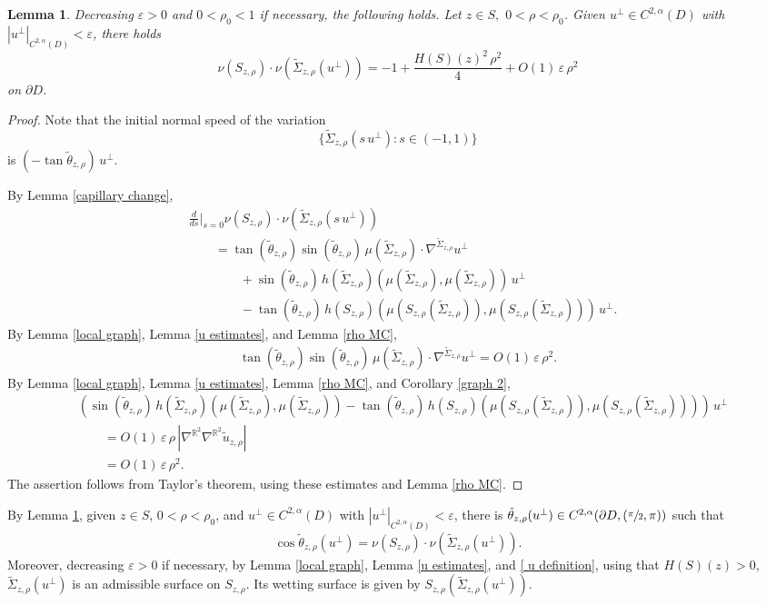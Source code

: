 \documentclass[11pt]{amsart}
\newtheorem{lem}[prop]{Lemma}
\begin{document}
\begin{lem} \label{angle} Decreasing $\varepsilon>0$ and $0<\rho_0<1$ if necessary, the following holds. Let $z\in S,$ $0<\rho<\rho_0$. Given $u^\perp\in C^{2,\alpha}(D)$ with $|u^\perp|_{C^{2,\alpha}(D)}<\varepsilon$, there holds
	$$
\nu(S_{z,\rho})\cdot \nu(\tilde \Sigma_{z,\rho}(u^\perp))=-1+\frac{H(S)(z)^2\,\rho^2}{4}+O(1)\,\varepsilon\,\rho^2
	$$
	on $\partial D$.
\end{lem}
\begin{proof}
Note that the initial normal speed of the variation $$\{\tilde \Sigma_{z,\rho}(s\,u^\perp):s\in(-1,1)\}$$  is $(-\tan\tilde \theta_{z,\rho})\,u^\perp$. 

	By Lemma \ref{capillary change},
\begin{align*} 
	&\frac{d}{ds}\bigg|_{s=0}\nu(S_{z,\rho})\cdot\nu(\tilde\Sigma_{z,\rho}(s\,u^\perp))
	\\&\qquad =\tan(\tilde \theta_{z,\rho})\sin(\tilde \theta_{z,\rho})\,\mu(\tilde \Sigma_{z,\rho})\cdot \nabla^{\tilde \Sigma_{z,\rho}}u^\perp 
	\\&\qquad\qquad +\sin(\tilde \theta_{z,\rho})\,h(\tilde \Sigma_{z,\rho})(\mu(\tilde \Sigma_{z,\rho}),\mu(\tilde \Sigma_{z,\rho}))\,u^\perp\\&\qquad\qquad-\tan(\tilde \theta_{z,\rho})\,h(S_{z,\rho})(\mu(S_{z,\rho}(\tilde \Sigma_{z,\rho})),\mu(S_{z,\rho}(\tilde \Sigma_{z,\rho})))\,u^\perp.
\end{align*} 
By Lemma \ref{local graph}, Lemma \ref{u estimates}, and Lemma \ref{rho MC},
\begin{align*} 
	\tan(\tilde \theta_{z,\rho})\sin(\tilde \theta_{z,\rho})\,\mu(\tilde \Sigma_{z,\rho})\cdot \nabla^{\tilde \Sigma_{z,\rho}}u^\perp =O(1)\,\varepsilon\,\rho^2.
\end{align*}
By Lemma \ref{local graph}, Lemma \ref{u estimates},  Lemma \ref{rho MC}, and Corollary \ref{graph 2},
\begin{align*} 
	&\left(\sin(\tilde \theta_{z,\rho})\,h(\tilde \Sigma_{z,\rho})(\mu(\tilde \Sigma_{z,\rho}),\mu(\tilde \Sigma_{z,\rho}))-\tan(\tilde \theta_{z,\rho})\,h(S_{z,\rho})(\mu(S_{z,\rho}(\tilde \Sigma_{z,\rho})),\mu(S_{z,\rho}(\tilde \Sigma_{z,\rho})))\right)\,u^\perp\\&\qquad=O(1)\,\varepsilon\,\rho\, |\nabla^{\mathbb{R}^2}\nabla^{\mathbb{R}^2}\tilde u_{z,\rho}|
	\\&\qquad =O(1)\,\varepsilon\,\rho^2.
\end{align*}
The assertion follows from Taylor's theorem, using these estimates and  Lemma \ref{rho MC}. 
\end{proof}
By Lemma \ref{angle}, given $z\in S$, $0<\rho<\rho_0$, and  $u^\perp\in C^{2,\alpha}(D)$ with $|u^\perp|_{C^{2,\alpha}(D)}<\varepsilon$, there is $\tilde \theta_{z,\rho}(u^\perp) \in C^{2,\alpha}(\partial D,(\sfrac{\pi}2,\pi))$ such that $$\cos\tilde\theta_{z,\rho}(u^\perp)=\nu(S_{z,\rho})\cdot \nu(\tilde \Sigma_{z,\rho}(u^\perp)).$$ Moreover, decreasing $\varepsilon>0$ if necessary, by Lemma \ref{local graph}, Lemma \ref{u estimates}, and \eqref{ u definition}, using that $H(S)(z)>0$, $\tilde \Sigma_{z,\rho}(u^\perp)$ is an admissible surface on $S_{z,\rho}$. Its wetting surface is given by $S_{z,\rho}(\tilde \Sigma_{z,\rho}(u^\perp))$.
\end{document}
